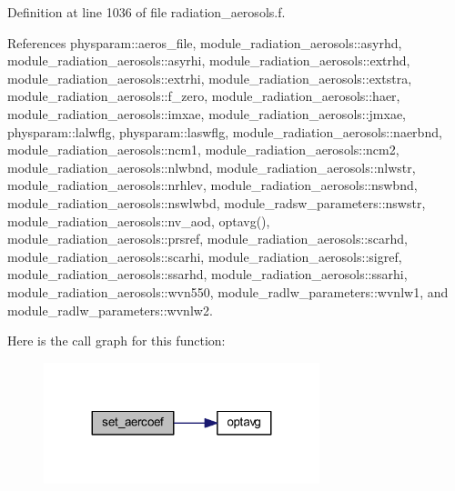 Definition at line 1036 of file radiation\+\_\+aerosols.\+f.



References physparam\+::aeros\+\_\+file, module\+\_\+radiation\+\_\+aerosols\+::asyrhd, module\+\_\+radiation\+\_\+aerosols\+::asyrhi, module\+\_\+radiation\+\_\+aerosols\+::extrhd, module\+\_\+radiation\+\_\+aerosols\+::extrhi, module\+\_\+radiation\+\_\+aerosols\+::extstra, module\+\_\+radiation\+\_\+aerosols\+::f\+\_\+zero, module\+\_\+radiation\+\_\+aerosols\+::haer, module\+\_\+radiation\+\_\+aerosols\+::imxae, module\+\_\+radiation\+\_\+aerosols\+::jmxae, physparam\+::lalwflg, physparam\+::laswflg, module\+\_\+radiation\+\_\+aerosols\+::naerbnd, module\+\_\+radiation\+\_\+aerosols\+::ncm1, module\+\_\+radiation\+\_\+aerosols\+::ncm2, module\+\_\+radiation\+\_\+aerosols\+::nlwbnd, module\+\_\+radiation\+\_\+aerosols\+::nlwstr, module\+\_\+radiation\+\_\+aerosols\+::nrhlev, module\+\_\+radiation\+\_\+aerosols\+::nswbnd, module\+\_\+radiation\+\_\+aerosols\+::nswlwbd, module\+\_\+radsw\+\_\+parameters\+::nswstr, module\+\_\+radiation\+\_\+aerosols\+::nv\+\_\+aod, optavg(), module\+\_\+radiation\+\_\+aerosols\+::prsref, module\+\_\+radiation\+\_\+aerosols\+::scarhd, module\+\_\+radiation\+\_\+aerosols\+::scarhi, module\+\_\+radiation\+\_\+aerosols\+::sigref, module\+\_\+radiation\+\_\+aerosols\+::ssarhd, module\+\_\+radiation\+\_\+aerosols\+::ssarhi, module\+\_\+radiation\+\_\+aerosols\+::wvn550, module\+\_\+radlw\+\_\+parameters\+::wvnlw1, and module\+\_\+radlw\+\_\+parameters\+::wvnlw2.



Here is the call graph for this function\+:
\nopagebreak
\begin{figure}[H]
\begin{center}
\leavevmode
\includegraphics[width=227pt]{zhang__orig_2radiation__aerosols_8f_a95fabbc4272ae70f3b345f9b1a898d46_cgraph}
\end{center}
\end{figure}


